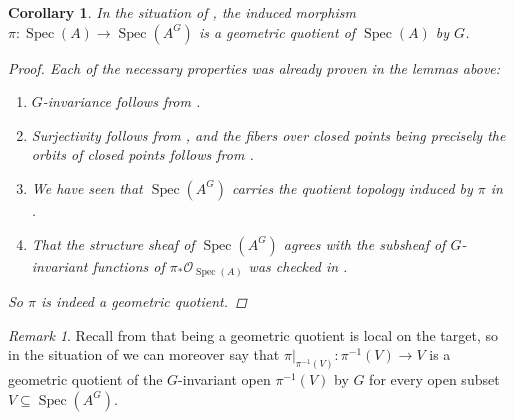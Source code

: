 \documentclass[12pt,a4paper]{amsart}
\theoremstyle{plain}
\newtheorem{cor}[thm]{Corollary}
\theoremstyle{definition}
\theoremstyle{remark}
\newtheorem{rem}[thm]{Remark}
\begin{document}
\begin{cor}\label{cor:affinequotient}
  In the situation of , the induced morphism $\pi \colon \operatorname{Spec}(A) \to \operatorname{Spec}(A^{G})$ is a geometric quotient of $\operatorname{Spec}(A)$ by $G$.

  \begin{proof}
    Each of the necessary properties was already proven in the lemmas above:
    \begin{enumerate}
      \item $G$-invariance follows from .
      \item Surjectivity follows from , and the fibers over closed points being precisely the orbits of closed points follows from .
      \item We have seen that $\operatorname{Spec}(A^{G})$ carries the quotient topology induced by $\pi$ in .
      \item That the structure sheaf of $\operatorname{Spec}(A^{G})$ agrees with the subsheaf of $G$-invariant functions of $\pi_{*}\mathscr{O}_{\operatorname{Spec}(A)}$ was checked in .
    \end{enumerate}
    So $\pi$ is indeed a geometric quotient.  
  \end{proof}

\end{cor}

\begin{rem}\label{rem:loct2}
  Recall from  that being a geometric quotient is local on the target, so in the situation of  we can moreover say that $\pi|_{\pi^{-1}(V)} \colon \pi^{-1}(V) \to V$ is a geometric quotient of the $G$-invariant open $\pi^{-1}(V)$ by $G$ for every open subset $V \subseteq \operatorname{Spec}(A^{G})$.
\end{rem}
\end{document}
